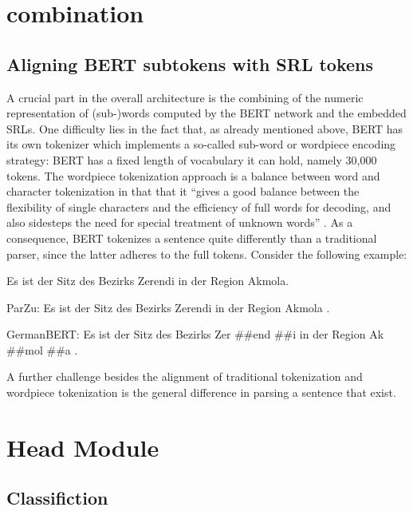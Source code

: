 \section{combination}

\subsection{Aligning BERT subtokens with SRL tokens}

A crucial part in the overall architecture is the combining of the numeric representation
of (sub-)words computed by the BERT network and the embedded SRLs. One difficulty lies in
the fact that, as already mentioned above, BERT has its own tokenizer which implements
a so-called sub-word or wordpiece \cite{wu2016google} encoding strategy: BERT has a
fixed length of vocabulary it can hold, namely 30,000 tokens. The wordpiece tokenization
approach is a balance between word and character tokenization in that that it ``gives
a good balance between the flexibility of single characters and the efficiency of full
words for decoding, and also sidesteps the need for special treatment of unknown words''
\citep[p.~2]{wu2016google}. As a consequence, BERT tokenizes a sentence quite differently
than a traditional parser, since the latter adheres to the full tokens. Consider the
following example:

\begin{examples}
	\label{ex:tokenization-diff}
	\item Es ist der Sitz des Bezirks Zerendi in der Region Akmola.
	\item ParZu: Es ist der Sitz des Bezirks Zerendi in der Region Akmola .
	\item GermanBERT: Es ist der Sitz des Bezirks Zer \#\#end \#\#i in der Region Ak \#\#mol \#\#a .
\end{examples}


A further challenge besides the alignment of traditional tokenization and wordpiece tokenization is
the general difference in parsing a sentence that exist.

\section{Head Module}


\subsection{Classifiction}

